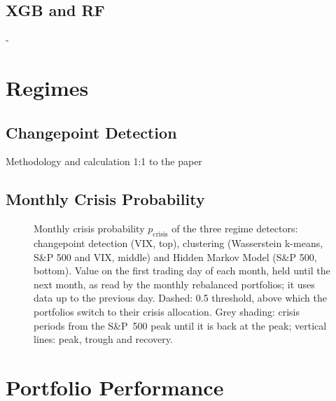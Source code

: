 \documentclass[12pt]{article}
\newcommand{\pcrisismonthlyfile}{data_finalized/figure_pcrisis_monthly.csv}
\newcommand{\regimepanelheight}{3cm}
\newcommand{\pcrisispanel}[3]{%
    \renewcommand{\crisisymin}{-0.06}%
    \renewcommand{\crisisymax}{1.06}%
    \begin{axis}[timechart, scale only axis, width=0.88\textwidth, height=\regimepanelheight,
                 ymin=-0.06, ymax=1.06, ytick={0,0.5,1}, ylabel={#2}, axis on top,
                 ymajorgrids=false, #3]
        \crises
        \addplot[forget plot, black!55, dashed, line width=0.4pt] coordinates {(1998-01-01,0.5) (2025-12-31,0.5)};
        \addplot[const plot, blue!70!black, line width=0.6pt, mark=none] table[x=date, y=#1] {\pcrisismonthlyfile};
    \end{axis}%
}
\newcommand{\crisisymin}{0}
\newcommand{\crisisymax}{1}
\newcommand{\crisisshadecolor}{gray!25}
\newcommand{\crisislinecolor}{red}
\newcommand{\crisisshade}[3]{%
    \addplot[forget plot, draw=none, fill=\crisisshadecolor] coordinates {(#1,\crisisymin) (#3,\crisisymin) (#3,\crisisymax) (#1,\crisisymax)} --cycle;
}
\newcommand{\crisismarks}[3]{%
    \addplot[forget plot, \crisislinecolor, line width=0.4pt, mark=none] coordinates {(#1,\crisisymin) (#1,\crisisymax)};
    \addplot[forget plot, \crisislinecolor, line width=0.4pt, mark=none] coordinates {(#2,\crisisymin) (#2,\crisisymax)};
    \addplot[forget plot, \crisislinecolor, line width=0.4pt, mark=none] coordinates {(#3,\crisisymin) (#3,\crisisymax)};
}
\newcommand{\crisis}[3]{\crisisshade{#1}{#2}{#3}\crisismarks{#1}{#2}{#3}}
\newcommand{\crisislist}[1]{%
    #1{1998-07-17}{1998-08-31}{1998-11-23}%
    #1{2000-03-24}{2002-10-09}{2007-05-30}%
    #1{2007-10-09}{2009-03-09}{2013-03-28}%
    #1{2018-09-20}{2018-12-24}{2019-04-23}%
    #1{2020-02-19}{2020-03-23}{2020-08-18}%
    #1{2022-01-03}{2022-10-12}{2024-01-19}%
    #1{2025-02-19}{2025-04-08}{2025-06-27}%
}
\newcommand{\crises}{\crisislist\crisis}
\begin{document}
\subsection{XGB and RF}
- 




\section{Regimes}

\subsection{Changepoint Detection}
Methodology and calculation 1:1 to the paper


\subsection{Monthly Crisis Probability}

\begin{figure}[htbp]
    \centering
    \caption{Monthly crisis probability $p_{\mathrm{crisis}}$ of the three regime detectors: changepoint detection (VIX, top), clustering (Wasserstein k-means, S\&P 500 and VIX, middle) and Hidden Markov Model (S\&P 500, bottom). Value on the first trading day of each month, held until the next month, as read by the monthly rebalanced portfolios; it uses data up to the previous day. Dashed: 0.5 threshold, above which the portfolios switch to their crisis allocation. Grey shading: crisis periods from the S\&P~500 peak until it is back at the peak; vertical lines: peak, trough and recovery.}
    \label{fig:pcrisis_monthly}
\end{figure}


\FloatBarrier
\section{Portfolio Performance}
\end{document}
